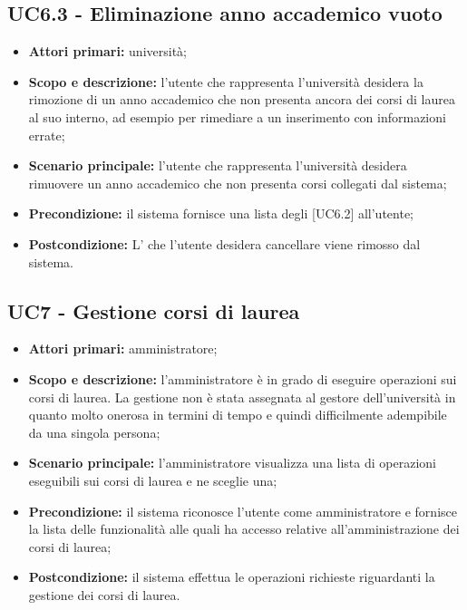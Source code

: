 \documentclass[AnalisiDeiRequisiti.tex]{subfiles}
\begin{document}
\subsection{UC6.3 - Eliminazione anno accademico vuoto}
\begin{itemize}
	\item \textbf{Attori primari:} università;
	\item \textbf{Scopo e descrizione:} l'utente che rappresenta l'università desidera la rimozione di un anno accademico che non presenta ancora dei corsi di laurea al suo interno, ad esempio per rimediare a un inserimento con informazioni errate;
	\item \textbf{Scenario principale:} l'utente che rappresenta l'università desidera rimuovere un anno accademico che non presenta corsi collegati dal sistema;
	\item \textbf{Precondizione:} il sistema fornisce una lista degli  [UC6.2] all'utente;
	\item \textbf{Postcondizione:} L' che l'utente desidera cancellare viene rimosso dal sistema.
\end{itemize}

\subsection{UC7 - Gestione corsi di laurea}
\begin{itemize}
	\item \textbf{Attori primari:} amministratore;
	\item \textbf{Scopo e descrizione:} l'amministratore è in grado di eseguire operazioni sui corsi di laurea. La gestione non è stata assegnata al gestore dell'università in quanto molto onerosa in termini di tempo e quindi difficilmente adempibile da una singola persona;
	\item \textbf{Scenario principale:} l'amministratore visualizza una lista di operazioni eseguibili sui corsi di laurea e ne sceglie una;
	\item \textbf{Precondizione:} il sistema riconosce l'utente come amministratore e fornisce la lista delle funzionalità alle quali ha accesso relative all'amministrazione dei corsi di laurea;
	\item \textbf{Postcondizione:} il sistema effettua le operazioni richieste riguardanti la gestione dei corsi di laurea.
\end{itemize}
\end{document}
